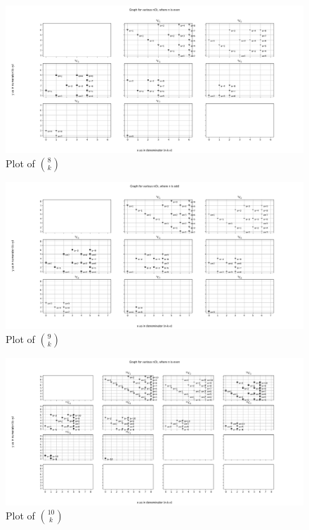 \documentclass[10pt, twoside]{article}
\newcommand*{\Combination}[2]{\binom{#1}{#2}}%
\begin{document}
\begin{appendices}
\begin{figure}[ph!]
	\label{7Ck}
\end{figure}
\begin{figure}[ph!]	
	\includegraphics[width=\linewidth]{8Ck.png}
	\caption{Plot of $\Combination{8}{k}$}
	\label{8Ck}
\end{figure}
\begin{figure}[ph!]	
	\includegraphics[width=\linewidth]{9Ck.png}
	\caption{Plot of $\Combination{9}{k}$}
	\label{9Ck}
\end{figure}
\begin{figure}[ph!]	
	\includegraphics[width=\linewidth]{10Ck.png}
	\caption{Plot of $\Combination{10}{k}$}
	\label{10Ck}
\end{figure}	

\end{appendices}
\end{document}
